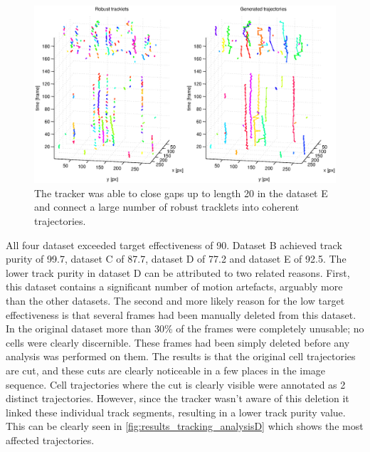 		\begin{figure}[h]
			\centering
			\includegraphics[width=\textwidth]{images/fig_results_tracking_analysis5}
			\caption{The tracker was able to close gaps up to length 20 in the dataset E and connect a large number of robust tracklets into coherent trajectories.}
			\label{fig:results_tracking_analysisE}
		\end{figure}

		All four dataset exceeded target effectiveness of 90. Dataset B achieved track purity of 99.7, dataset C of 87.7, dataset D of 77.2 and dataset E of 92.5. The lower track purity in dataset D can be attributed to two related reasons. First, this dataset contains a significant number of motion artefacts, arguably more than the other datasets. The second and more likely reason for the low target effectiveness is that several frames had been manually deleted from this dataset. In the original dataset more than 30\% of the frames were completely unusable; no cells were clearly discernible. These frames had been simply deleted before any analysis was performed on them. The results is that the original cell trajectories are cut, and these cuts are clearly noticeable in a few places in the image sequence. Cell trajectories where the cut is clearly visible were annotated as 2 distinct trajectories. However, since the tracker wasn't aware of this deletion it linked these individual track segments, resulting in a lower track purity value. This can be clearly seen in \cref{fig:results_tracking_analysisD} which shows the most affected trajectories.
		
